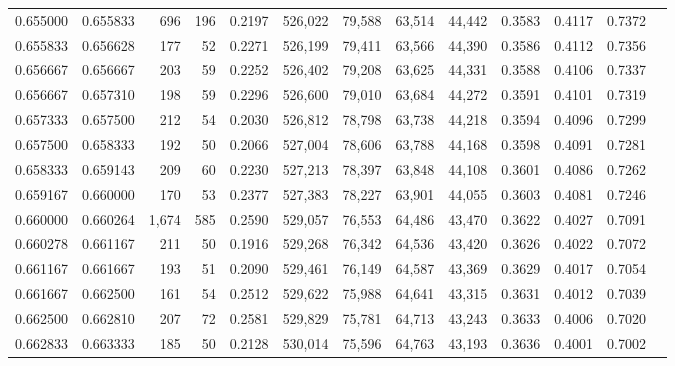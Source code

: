 \begin{tabular}{rrrrrrrrrrrrr}
0.655000 & 0.655833 &   696 & 196 &                                     0.2197 & 526,022 &  79,588 &  63,514 &  44,442 & 0.3583 & 0.4117 & 0.7372 \\
0.655833 & 0.656628 &   177 &  52 &                                     0.2271 & 526,199 &  79,411 &  63,566 &  44,390 & 0.3586 & 0.4112 & 0.7356 \\
0.656667 & 0.656667 &   203 &  59 &                                     0.2252 & 526,402 &  79,208 &  63,625 &  44,331 & 0.3588 & 0.4106 & 0.7337 \\
0.656667 & 0.657310 &   198 &  59 &                                     0.2296 & 526,600 &  79,010 &  63,684 &  44,272 & 0.3591 & 0.4101 & 0.7319 \\
0.657333 & 0.657500 &   212 &  54 &                                     0.2030 & 526,812 &  78,798 &  63,738 &  44,218 & 0.3594 & 0.4096 & 0.7299 \\
0.657500 & 0.658333 &   192 &  50 &                                     0.2066 & 527,004 &  78,606 &  63,788 &  44,168 & 0.3598 & 0.4091 & 0.7281 \\
0.658333 & 0.659143 &   209 &  60 &                                     0.2230 & 527,213 &  78,397 &  63,848 &  44,108 & 0.3601 & 0.4086 & 0.7262 \\
0.659167 & 0.660000 &   170 &  53 &                                     0.2377 & 527,383 &  78,227 &  63,901 &  44,055 & 0.3603 & 0.4081 & 0.7246 \\
0.660000 & 0.660264 & 1,674 & 585 &                                     0.2590 & 529,057 &  76,553 &  64,486 &  43,470 & 0.3622 & 0.4027 & 0.7091 \\
0.660278 & 0.661167 &   211 &  50 &                                     0.1916 & 529,268 &  76,342 &  64,536 &  43,420 & 0.3626 & 0.4022 & 0.7072 \\
0.661167 & 0.661667 &   193 &  51 &                                     0.2090 & 529,461 &  76,149 &  64,587 &  43,369 & 0.3629 & 0.4017 & 0.7054 \\
0.661667 & 0.662500 &   161 &  54 &                                     0.2512 & 529,622 &  75,988 &  64,641 &  43,315 & 0.3631 & 0.4012 & 0.7039 \\
0.662500 & 0.662810 &   207 &  72 &                                     0.2581 & 529,829 &  75,781 &  64,713 &  43,243 & 0.3633 & 0.4006 & 0.7020 \\
0.662833 & 0.663333 &   185 &  50 &                                     0.2128 & 530,014 &  75,596 &  64,763 &  43,193 & 0.3636 & 0.4001 & 0.7002 \\

\end{tabular}

